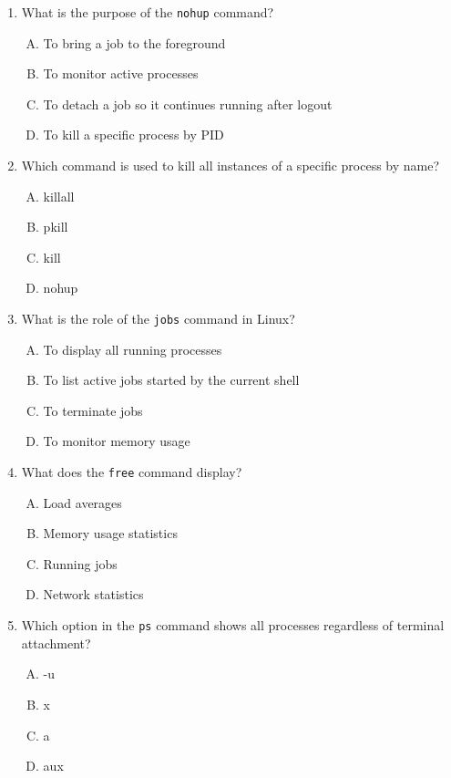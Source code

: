 \documentclass[a4paper]{report}
\begin{document}
\begin{enumerate}[1.]
    \item What is the purpose of the \texttt{nohup} command?  
    \begin{enumerate}[A)]
        \item To bring a job to the foreground  
        \item To monitor active processes  
        \item To detach a job so it continues running after logout  
        \item To kill a specific process by PID  
    \end{enumerate}

    \item Which command is used to kill all instances of a specific process by name?  
    \begin{enumerate}[A)]
        \item killall  
        \item pkill  
        \item kill  
        \item nohup  
    \end{enumerate}

    \item What is the role of the \texttt{jobs} command in Linux?  
    \begin{enumerate}[A)]
        \item To display all running processes  
        \item To list active jobs started by the current shell  
        \item To terminate jobs  
        \item To monitor memory usage  
    \end{enumerate}

    \item What does the \texttt{free} command display?  
    \begin{enumerate}[A)]
        \item Load averages  
        \item Memory usage statistics  
        \item Running jobs  
        \item Network statistics  
    \end{enumerate}

    \item Which option in the \texttt{ps} command shows all processes regardless of terminal attachment?  
    \begin{enumerate}[A)]
        \item -u  
        \item x  
        \item a  
        \item aux  
    \end{enumerate}


\end{enumerate}
\end{document}
